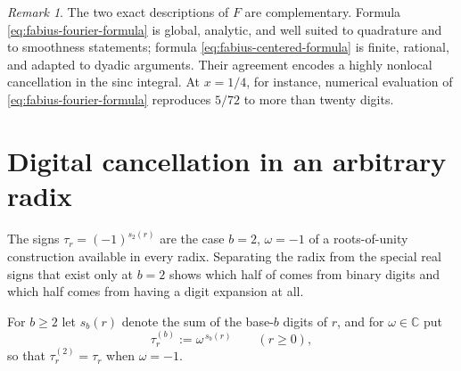 \documentclass[11pt,oneside,openany]{book}
\theoremstyle{definition}
\theoremstyle{remark}
\newtheorem{remark}[remark]{Remark}
\newcommand{\C}{\mathbb C}
\newcommand{\defeq}{\mathrel{:=}}
\begin{document}
\begin{remark}
The two exact descriptions of $F$ are complementary.  Formula
\eqref{eq:fabius-fourier-formula} is global, analytic, and well suited to quadrature and
to smoothness statements; formula \eqref{eq:fabius-centered-formula} is finite,
rational, and adapted to dyadic arguments.  Their agreement encodes a highly nonlocal
cancellation in the sinc integral.  At $x=1/4$, for instance, numerical evaluation of
\eqref{eq:fabius-fourier-formula} reproduces $5/72$ to more than twenty digits.
\end{remark}

\section{Digital cancellation in an arbitrary radix}

The signs $\tau_r=(-1)^{s_2(r)}$ are the case $b=2$, $\omega=-1$ of a roots-of-unity construction available in every radix.  Separating the radix from the special real signs that exist only at $b=2$ shows which half of  comes from binary digits and which half comes from having a digit expansion at all.

For $b\ge2$ let $s_b(r)$ denote the sum of the base-$b$ digits of $r$, and for $\omega\in\C$ put
\begin{equation}\label{eq:radix-b-signs}
 \tau^{(b)}_r\defeq\omega^{\,s_b(r)}
 \qquad(r\ge0),
\end{equation}
so that $\tau^{(2)}_r=\tau_r$ when $\omega=-1$.
\end{document}
